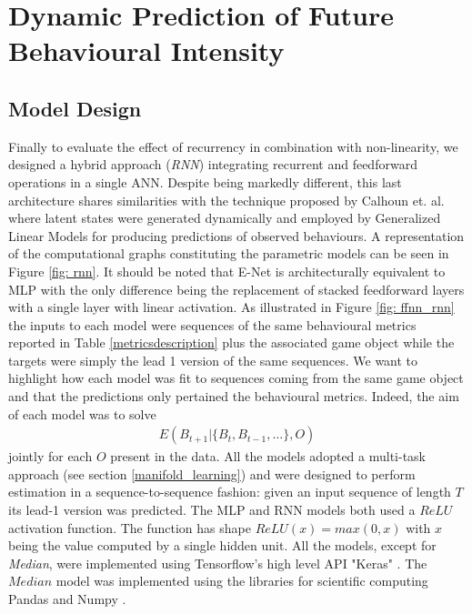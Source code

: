 \section{Dynamic Prediction of Future Behavioural Intensity}
\label{model_architecture_1}
\lorem

\subsection{Model Design}
Finally to evaluate the effect of recurrency in combination with non-linearity, we designed a hybrid approach (\textit{RNN}) integrating recurrent and feedforward operations in a single ANN. Despite being markedly different, this last architecture shares similarities with the technique proposed by Calhoun et. al. \cite{calhoun2019unsupervised} where latent states were generated dynamically and employed by Generalized Linear Models for producing predictions of observed behaviours. A representation of the computational graphs constituting the parametric models can be seen in Figure \ref{fig: rnn}. It should be noted that E-Net is architecturally equivalent to MLP with the only difference being the replacement of stacked feedforward layers with a single layer with linear activation. As illustrated in Figure \ref{fig: ffnn_rnn} the inputs to each model were sequences of the same behavioural metrics reported in Table \ref{metricsdescription} plus the associated game object while the targets were simply the lead 1 version of the same sequences. We want to highlight how each model was fit to sequences coming from the same game object and that the predictions only pertained the behavioural metrics. Indeed, the aim of each model was to solve
\begin{equation}
    \begin{gathered}
        E(B_{t+1} | \{B_{t}, B_{t-1}, \dots \} , O)
        \label{model_obj}
    \end{gathered}
\end{equation}
jointly for each $O$ present in the data. All the models adopted a multi-task approach (see section \ref{manifold_learning}) and were designed to perform estimation in a sequence-to-sequence fashion: given an input sequence of length $T$ its lead-1 version was predicted. The MLP and RNN models both used a $ReLU$ activation function. The function has shape $ReLU(x) = max(0, x)$ with $x$ being the value computed by a single hidden unit. All the models, except for \textit{Median}, were implemented using Tensorflow's high level API "Keras" \cite{tensorflow2015-whitepaper,chollet2015keras}. The $Median$ model was implemented using the libraries for scientific computing Pandas and Numpy \cite{reback2020pandas,harris2020array}.

